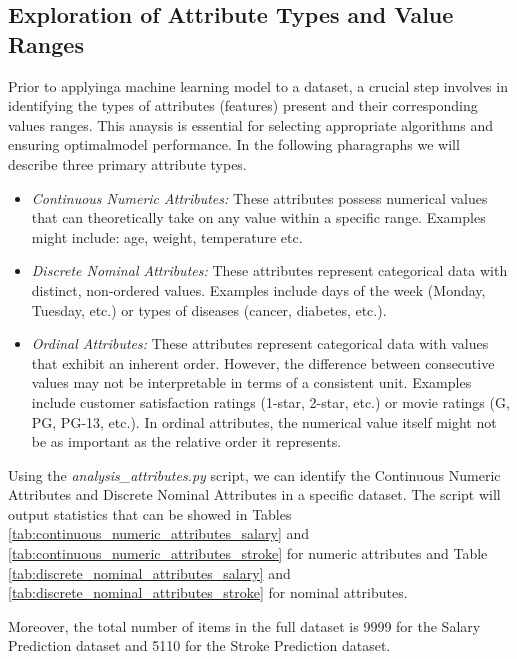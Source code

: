 \documentclass[runningheads]{paper}
\begin{document}
\subsection{Exploration of Attribute Types and Value Ranges}
Prior to applyinga machine learning model to a dataset, a crucial step involves
in identifying the types of attributes (features) present and their corresponding
values ranges. This anaysis is essential for selecting appropriate algorithms 
and ensuring optimalmodel performance. In the following pharagraphs we will
describe three primary attribute types.
\begin{itemize}
    \item \textit{Continuous Numeric Attributes:}
    These attributes possess numerical values that can theoretically take on any 
    value within a specific range. Examples might include: age, weight, temperature etc.
    \item \textit{Discrete Nominal Attributes:}
    These attributes represent categorical data with distinct, non-ordered values. 
    Examples include days of the week (Monday, Tuesday, etc.) or types of diseases 
    (cancer, diabetes, etc.).
    \item \textit{Ordinal Attributes:}
    These attributes represent categorical data with values that exhibit an inherent 
    order. However, the difference between consecutive values may not be interpretable 
    in terms of a consistent unit.  Examples include customer satisfaction ratings 
    (1-star, 2-star, etc.) or movie ratings (G, PG, PG-13, etc.). In ordinal 
    attributes, the numerical value itself might not be as important as the relative 
    order it represents.
\end{itemize}

Using the \textit{analysis\_attributes.py} script, we can identify the 
Continuous Numeric Attributes and Discrete Nominal Attributes in a specific 
dataset. The script will output statistics that can be showed in Tables 
\ref{tab:continuous_numeric_attributes_salary} and 
\ref{tab:continuous_numeric_attributes_stroke} for numeric attributes and
Table \ref{tab:discrete_nominal_attributes_salary} and 
\ref{tab:discrete_nominal_attributes_stroke} for nominal attributes.

Moreover, the total number of items in the full dataset is 9999 for the Salary
Prediction dataset and 5110 for the Stroke Prediction dataset.
\end{document}
